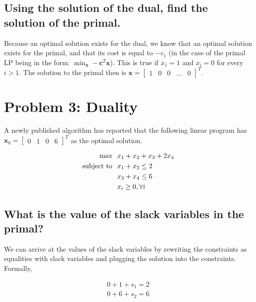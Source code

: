 \documentclass{article}
\begin{document}
\subsection{Using the solution of the dual, find the solution of the primal.}

Because an optimal solution exists for the dual, we know that an optimal solution exists for the primal, and that its cost is equal to $-c_1$ (in the case of the primal LP being in the form: $\min_\mathbf{x} -\mathbf{c}^T \mathbf{x}$). This is true if $x_1 = 1$ and $x_i = 0$ for every $i > 1$. The solution to the primal then is $\mathbf{x} = \begin{bmatrix}1 & 0 & 0 & \dots & 0\end{bmatrix}^T$.

\newpage

\section{Problem 3: Duality}

A newly published algorithm has reported that the following linear program has $\mathbf{x}_0 = \begin{bmatrix} 0 & 1 & 0 & 6 \end{bmatrix}^T$ as the optimal solution.

\begin{align*}
\text{max} & \hspace{0.1in} x_1 + x_2 + x_3 + 2x_4\\
\text{subject to} & \hspace{0.1in} x_1 + x_2 \le 2\\
& \hspace{0.1in} x_3 + x_4 \le 6\\
& \hspace{0.1in} x_i \ge 0, \forall i
\end{align*}

\subsection{What is the value of the slack variables in the primal?} \label{sec:slack_primal}

We can arrive at the values of the slack variables by rewriting the constraints as equalities with slack variables and plugging the solution into the constraints. Formally,

\begin{align*}
0 + 1 + s_1 = 2\\
0 + 6 + s_2 = 6
\end{align*}
\end{document}
